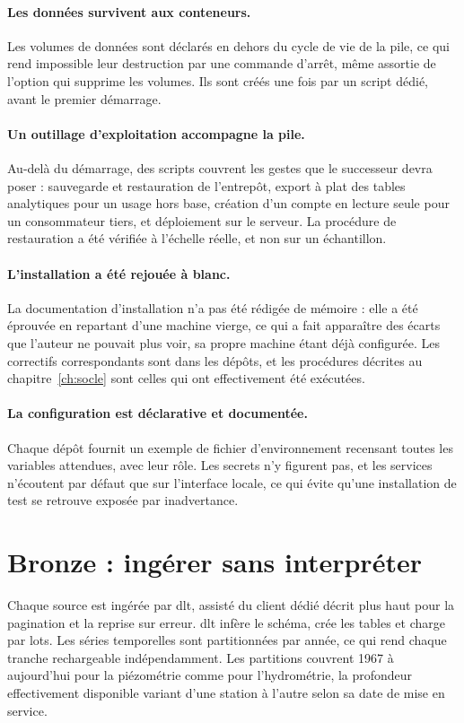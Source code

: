 \paragraph{Les données survivent aux conteneurs.} Les volumes de données sont déclarés en dehors
du cycle de vie de la pile, ce qui rend impossible leur destruction par une commande d'arrêt,
même assortie de l'option qui supprime les volumes. Ils sont créés une fois par un script dédié,
avant le premier démarrage.

\paragraph{Un outillage d'exploitation accompagne la pile.} Au-delà du démarrage, des scripts
couvrent les gestes que le successeur devra poser : sauvegarde et restauration de l'entrepôt,
export à plat des tables analytiques pour un usage hors base, création d'un compte en lecture
seule pour un consommateur tiers, et déploiement sur le serveur. La procédure de restauration a
été vérifiée à l'échelle réelle, et non sur un échantillon.

\paragraph{L'installation a été rejouée à blanc.} La documentation d'installation n'a pas été
rédigée de mémoire : elle a été éprouvée en repartant d'une machine vierge, ce qui a fait
apparaître des écarts que l'auteur ne pouvait plus voir, sa propre machine étant déjà
configurée. Les correctifs correspondants sont dans les dépôts, et les procédures décrites au
chapitre~\ref{ch:socle} sont celles qui ont effectivement été exécutées.

\paragraph{La configuration est déclarative et documentée.} Chaque dépôt fournit un exemple de
fichier d'environnement recensant toutes les variables attendues, avec leur rôle. Les secrets
n'y figurent pas, et les services n'écoutent par défaut que sur l'interface locale, ce qui évite
qu'une installation de test se retrouve exposée par inadvertance.

\section{Bronze : ingérer sans interpréter}

Chaque source est ingérée par dlt, assisté du client dédié décrit plus haut pour la pagination
et la reprise sur erreur. dlt infère le schéma, crée les tables et charge par lots. Les séries temporelles sont partitionnées par année, ce qui rend chaque tranche
rechargeable indépendamment. Les partitions couvrent 1967 à aujourd'hui pour la piézométrie
comme pour l'hydrométrie, la profondeur effectivement disponible variant d'une station à
l'autre selon sa date de mise en service.

